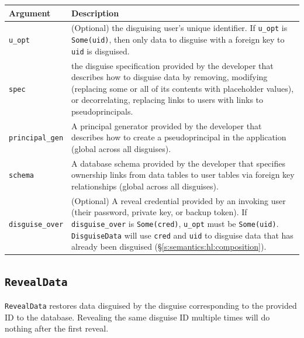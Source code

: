     \begin{center}
    \begin{longtable}{|m{}|m{}|}
        \hline
        \textbf{Argument} & \textbf{Description} \\
        \hline
        \texttt{u\_opt}& (Optional) the disguising user's unique identifier. If
            \texttt{u\_opt} is \texttt{Some(uid)}, then only data to disguise with
            a foreign key to \texttt{uid} is disguised.\\

        \hline
        \texttt{spec}& the disguise specification provided by the
            developer that describes how to disguise data by
    removing, modifying (replacing some or all of its contents with placeholder
    values), or decorrelating, replacing links to users with links to
    pseudoprincipals.\\

        \hline
        \texttt{principal\_gen}& A principal generator provided by the developer
    that describes how to create a pseudoprincipal in the application (global
            across all disguises).\\
        \hline
        \texttt{schema}& A database schema provided by the developer that specifies
    ownership links from data tables to user tables via foreign key
    relationships (global across all disguises).\\

        \hline
        \texttt{disguise\_over}& (Optional) A reveal credential provided by an
        invoking user (their password, private key, or backup token).
    If \texttt{disguise\_over} is \texttt{Some(cred)}, \texttt{u\_opt} must be
    \texttt{Some(uid)}. \texttt{DisguiseData} will use \texttt{cred} and
    \texttt{uid} to disguise data that has already been disguised
    (\S\ref{s:semantics:hl:composition}).\\
        \hline
    \end{longtable}
    \end{center}

    \subsection{\texttt{RevealData}}

    \texttt{RevealData} restores data disguised by the disguise corresponding to the provided ID to
    the database. Revealing the same disguise ID multiple times will do nothing
    after the first reveal. 

